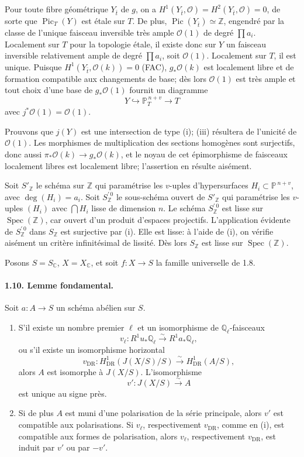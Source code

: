 \documentclass[10pt]{article}
\newcommand{\C}{\mathbb C}
\newcommand{\Pj}{\mathbb P}
\newcommand{\Q}{\mathbb Q}
\newcommand{\Z}{\mathbb Z}
\newcommand{\DR}{\mathrm{DR}}
\newcommand{\Spec}{\operatorname{Spec}}
\newcommand{\Pic}{\operatorname{Pic}}
\newcommand{\iso}{\xrightarrow{\sim}}
\begin{document}
Pour toute fibre géométrique \(Y_{\bar t}\) de \(g\), on a \(H^1(Y_{\bar t},\mathcal O)=H^2(Y_{\bar t},\mathcal O)=0\), de sorte que \(\Pic_{T}(Y)\) est étale sur \(T\). De plus, \(\Pic(Y_{\bar t})\simeq\Z\), engendré par la classe de l'unique faisceau inversible très ample \(\mathcal O(1)\) de degré \(\prod a_i\). Localement sur \(T\) pour la topologie étale, il existe donc sur \(Y\) un faisceau inversible relativement ample de degré \(\prod a_i\), soit \(\mathcal O(1)\). Localement sur \(T\), il est unique. Puisque \(H^1(Y_{\bar t},\mathcal O(k))=0\) (FAC), \(g_*\mathcal O(k)\) est localement libre et de formation compatible aux changements de base; dès lors \(\mathcal O(1)\) est très ample et tout choix d'une base de \(g_*\mathcal O(1)\) fournit un diagramme
\[
Y\hookrightarrow \Pj^{\,n+v}_T\longrightarrow T
\]
avec \(j^*\mathcal O(1)=\mathcal O(1)\).

Prouvons que \(j(Y)\) est une intersection de type (i); (iii) résultera de l'unicité de \(\mathcal O(1)\). Les morphismes de multiplication des sections homogènes sont surjectifs, donc aussi \(\pi_*\mathcal O(k)\to g_*\mathcal O(k)\), et le noyau de cet épimorphisme de faisceaux localement libres est localement libre; l'assertion en résulte aisément.

Soit \(S'_\Z\) le schéma sur \(\Z\) qui paramétrise les \(v\)-uples d'hypersurfaces \(H_i\subset\Pj^{\,n+v}\), avec \(\deg(H_i)=a_i\). Soit \(S_\Z^{\prime\,0}\) le sous-schéma ouvert de \(S'_\Z\) qui paramétrise les \(v\)-uples \((H_i)\) avec \(\bigcap H_i\) lisse de dimension \(n\). Le schéma \(S_\Z^{\prime\,0}\) est lisse sur \(\Spec(\Z)\), car ouvert d'un produit d'espaces projectifs. L'application évidente de \(S_\Z^{\prime\,0}\) dans \(S_\Z\) est surjective par (i). Elle est lisse: à l'aide de (i), on vérifie aisément un critère infinitésimal de lissité. Dès lors \(S_\Z\) est lisse sur \(\Spec(\Z)\).

Posons \(S=S_\C\), \(X=X_\C\), et soit \(f:X\to S\) la famille universelle de 1.8.

\paragraph{1.10. Lemme fondamental.} Soit \(a:A\to S\) un schéma abélien sur \(S\).
\begin{enumerate}[label=(\roman*)]
\item S'il existe un nombre premier \(\ell\) et un isomorphisme de \(\Q_\ell\)-faisceaux
\[
v_\ell:R^1u_*\Q_\ell\iso R^1a_*\Q_\ell,
\]
ou s'il existe un isomorphisme horizontal
\[
v_{\DR}:H^1_{\DR}(J(X/S)/S)\iso H^1_{\DR}(A/S),
\]
alors \(A\) est isomorphe à \(J(X/S)\). L'isomorphisme
\[
v':J(X/S)\iso A
\]
est unique au signe près.
\item Si de plus \(A\) est muni d'une polarisation de la série principale, alors \(v'\) est compatible aux polarisations. Si \(v_\ell\), respectivement \(v_{\DR}\), comme en (i), est compatible aux formes de polarisation, alors \(v_\ell\), respectivement \(v_{\DR}\), est induit par \(v'\) ou par \(-v'\).
\end{enumerate}
\end{document}
